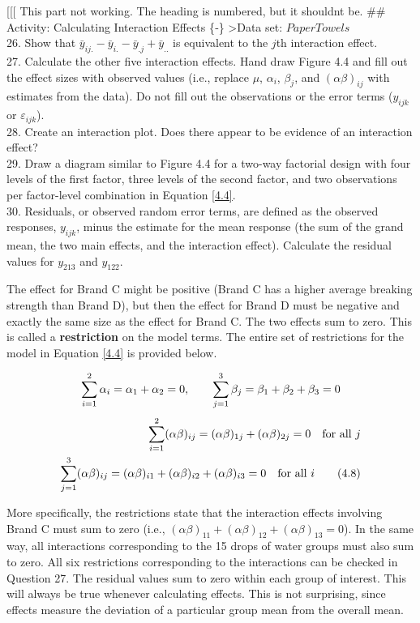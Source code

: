 \documentclass[
]{report}
\begin{document}
{[}{[}{[} This part not working. The heading is numbered, but it shouldnt be.
\#\# Activity: Calculating Interaction Effects \{‑\}
\textgreater Data set: \(PaperTowels\)\\
26. Show that \(\bar{y}_{ij.} - \bar{y}_{i.} - \bar{y}_{.j} + \bar{y}_{..}\) is equivalent to the \(j\)th interaction effect.\\
27. Calculate the other five interaction effects. Hand draw Figure 4.4 and fill out the effect sizes with observed values (i.e., replace \(\mu\), \(\alpha_i\), \(\beta_j\), and \((\alpha\beta)_{ij}\) with estimates from the data). Do not fill out the observations or the error terms (\(y_{ijk}\) or \(\varepsilon_{ijk}\)).\\
28. Create an interaction plot. Does there appear to be evidence of an interaction effect?\\
29. Draw a diagram similar to Figure 4.4 for a two-way factorial design with four levels of the first factor, three levels of the second factor, and two observations per factor-level combination in Equation \ref{4.4}.\\
30. Residuals, or observed random error terms, are defined as the observed responses, \(y_{ijk}\), minus the estimate for the mean response (the sum of the grand mean, the two main effects, and the interaction effect). Calculate the residual values for \(y_{213}\) and \(y_{122}\).

The effect for Brand C might be positive (Brand C has a higher average breaking strength than Brand D), but then the effect for Brand D must be negative and exactly the same size as the effect for Brand C. The two effects sum to zero. This is called a \textbf{restriction} on the model terms. The entire set of restrictions for the model in Equation \ref{4.4} is provided below.

\begin{align}\label{4.8}
\sum_{i=1}^{2} \alpha_i = \alpha_1 + \alpha_2 = 0, \qquad \sum_{j=1}^{3} \beta_j = \beta_1 + \beta_2 + \beta_3 = 0 \notag
\end{align}
\begin{align}
\sum_{i=1}^{2} (\alpha\beta)_{ij} = (\alpha\beta)_{1j} + (\alpha\beta)_{2j} = 0 \quad \text{for all } j \notag \\
\sum_{j=1}^{3} (\alpha\beta)_{ij} = (\alpha\beta)_{i1} + (\alpha\beta)_{i2} + (\alpha\beta)_{i3} = 0 \quad \text{for all } i \tag{4.8}
\end{align}

More specifically, the restrictions state that the interaction effects involving Brand C must sum to zero (i.e., \((\alpha\beta)_{11} + (\alpha\beta)_{12} + (\alpha\beta)_{13} = 0\)). In the same way, all interactions corresponding to the 15 drops of water groups must also sum to zero. All six restrictions corresponding to the interactions can be checked in Question 27. The residual values sum to zero within each group of interest. This will always be true whenever calculating effects. This is not surprising, since effects measure the deviation of a particular group mean from the overall mean.
\end{document}
